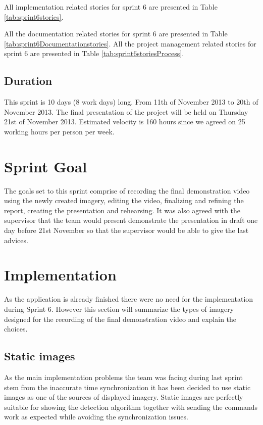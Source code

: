 All implementation related stories for sprint 6 are presented in Table \ref{tab:sprint6stories}.

All the documentation related stories for sprint 6 are presented in Table \ref{tab:sprint6Documentationstories}. 
 All the project management related stories for sprint 6 are presented in Table \ref{tab:sprint6storiesProcess}.


\subsection{Duration}
This sprint is 10 days (8 work days) long. From 11th of November 2013 to 20th of November 2013. The final presentation of the project will be held on Thursday 21st of November 2013.
Estimated velocity is 160 hours since we agreed on 25 working hours per person per week. 

\section{Sprint Goal}
The goals set to this sprint comprise of recording the final demonstration video using the newly created imagery, editing the video, finalizing and refining the report, creating the presentation and rehearsing. It was also agreed with the supervisor that the team would present demonstrate the presentation in draft one day before 21st November so that the supervisor would be able to give the last advices.

\section{Implementation}
As the application is already finished there were no need for the implementation during Sprint 6. However this section will summarize the types of imagery designed for the recording of the final demonstration video and explain the choices.

\subsection{Static images}
As the main implementation problems the team was facing during last sprint stem from the inaccurate time synchronization it has been decided to use static images as one of the sources of displayed imagery. Static images are perfectly suitable for showing the detection algorithm together with sending the commands work as expected while avoiding the synchronization issues.

